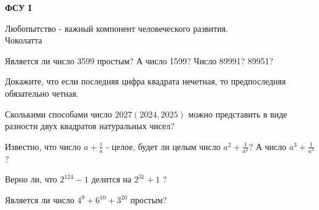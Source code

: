 \centerline{\bf \Huge ФСУ I}

\begin{flushright}
        \scriptsize{Любопытство - важный компонент человеческого развития.\\Чоколатта}
\end{flushright}

Является ли число 3599 простым? А число 1599? Число 89991? 89951?

Докажите, что если последняя цифра квадрата нечетная, то предпоследняя обязательно четная.

Сколькими способами число $2027(2024,2025)$ можно представить в виде разности двух квадратов натуральных чисел?

Известно, что число $a+\frac{1}{a}$ - целое, будет ли целым число $a^2+\frac{1}{a^2}$? А число $a^3+\frac{1}{a^3}$?

Верно ли, что $2^{124}-1$ делится на $2^{31}+1$ ?

Является ли число $4^9+6^{10}+3^{20}$ простым?

